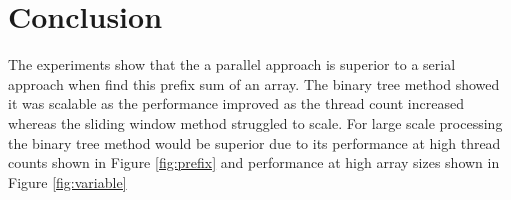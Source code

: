 \documentclass[conference]{IEEEtran}
\begin{document}
\section{Conclusion}
The experiments show that the a parallel approach is superior to a serial approach when find this prefix sum of an array. 
The binary tree method showed it was scalable as the performance improved as the thread count increased whereas the sliding window method struggled to scale.
For large scale processing the binary tree method would be superior due to its performance at high thread counts shown in Figure \ref{fig:prefix} and performance at high array sizes shown in Figure \ref{fig:variable}
\end{document}
